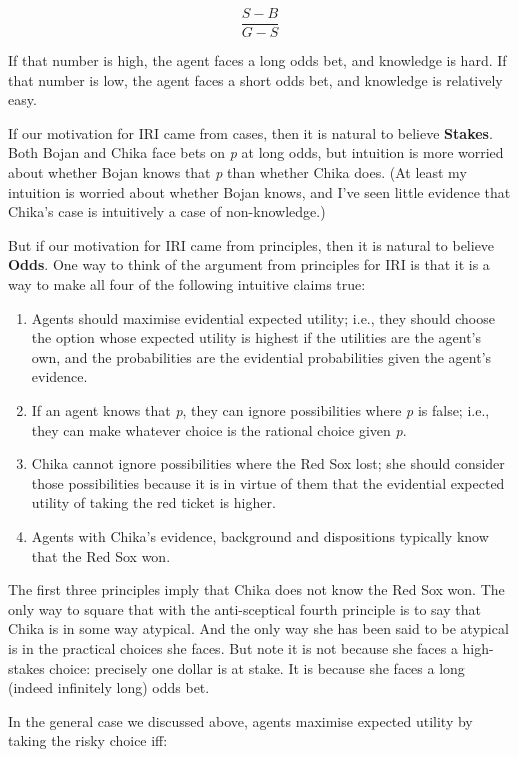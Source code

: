 \documentclass[
  11pt,
  letterpaper,
  DIV=11,
  numbers=noendperiod,
  twoside]{scrartcl}
\providecommand{\tightlist}{%
  \setlength{\itemsep}{0pt}\setlength{\parskip}{0pt}}
\begin{document}
\[
\frac{S-B}{G-S}
\]

If that number is high, the agent faces a long odds bet, and knowledge
is hard. If that number is low, the agent faces a short odds bet, and
knowledge is relatively easy.

If our motivation for IRI came from cases, then it is natural to believe
\textbf{Stakes}. Both Bojan and Chika face bets on \emph{p} at long
odds, but intuition is more worried about whether Bojan knows that
\emph{p} than whether Chika does. (At least my intuition is worried
about whether Bojan knows, and I've seen little evidence that Chika's
case is intuitively a case of non-knowledge.)

But if our motivation for IRI came from principles, then it is natural
to believe \textbf{Odds}. One way to think of the argument from
principles for IRI is that it is a way to make all four of the following
intuitive claims true:

\begin{enumerate}
\def\labelenumi{\arabic{enumi}.}
\tightlist
\item
  Agents should maximise evidential expected utility; i.e., they should
  choose the option whose expected utility is highest if the utilities
  are the agent's own, and the probabilities are the evidential
  probabilities given the agent's evidence.
\item
  If an agent knows that \emph{p}, they can ignore possibilities where
  \emph{p} is false; i.e., they can make whatever choice is the rational
  choice given \emph{p}.
\item
  Chika cannot ignore possibilities where the Red Sox lost; she should
  consider those possibilities because it is in virtue of them that the
  evidential expected utility of taking the red ticket is higher.
\item
  Agents with Chika's evidence, background and dispositions typically
  know that the Red Sox won.
\end{enumerate}

The first three principles imply that Chika does not know the Red Sox
won. The only way to square that with the anti-sceptical fourth
principle is to say that Chika is in some way atypical. And the only way
she has been said to be atypical is in the practical choices she faces.
But note it is not because she faces a high-stakes choice: precisely one
dollar is at stake. It is because she faces a long (indeed infinitely
long) odds bet.

In the general case we discussed above, agents maximise expected utility
by taking the risky choice iff:
\end{document}
